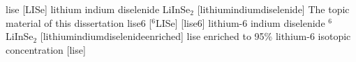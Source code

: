 \newglsXchemical%
{lise}%
[LISe]%
{lithium indium diselenide}%
{LiInSe$_2$}%
[lithiumindiumdiselenide]%
{The topic material of this dissertation}%
\newglsXchemical%
{lise6}%
[{}$^6$LISe]%
[lise6]%
{lithium-6 indium diselenide}%
{{}$^6$LiInSe$_2$}%
[lithiumindiumdiselenideenriched]%
{\Glsdesc{lise} enriched to 95\% lithium-6 isotopic concentration}%
[lise]%
